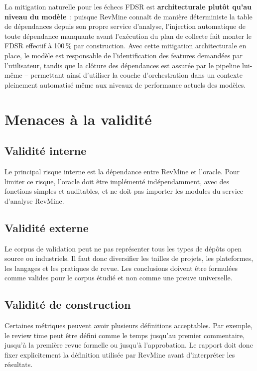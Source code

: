 La mitigation naturelle pour les échecs FDSR est \textbf{architecturale plutôt qu'au niveau du
modèle}~: puisque RevMine connaît de manière déterministe la table de dépendances depuis son
propre service d'analyse, l'injection automatique de toute dépendance manquante avant l'exécution
du plan de collecte fait monter le FDSR effectif à 100\,\% par construction. Avec cette
mitigation architecturale en place, le modèle est responsable de l'identification des features
demandées par l'utilisateur, tandis que la clôture des dépendances est assurée par le pipeline
lui-même -- permettant ainsi d'utiliser la couche d'orchestration dans un contexte pleinement
automatisé même aux niveaux de performance actuels des modèles.


\section{Menaces à la validité}
\label{sec:menaces-validite}

\subsection{Validité interne}

Le principal risque interne est la dépendance entre RevMine et l'oracle. Pour limiter ce risque, l'oracle doit être implémenté indépendamment, avec des fonctions simples et auditables, et ne doit pas importer les modules du service d'analyse RevMine.

\subsection{Validité externe}

Le corpus de validation peut ne pas représenter tous les types de dépôts open source ou industriels. Il faut donc diversifier les tailles de projets, les plateformes, les langages et les pratiques de revue. Les conclusions doivent être formulées comme valides pour le corpus étudié et non comme une preuve universelle.

\subsection{Validité de construction}

Certaines métriques peuvent avoir plusieurs définitions acceptables. Par exemple, le review time peut être défini comme le temps jusqu'au premier commentaire, jusqu'à la première revue formelle ou jusqu'à l'approbation. Le rapport doit donc fixer explicitement la définition utilisée par RevMine avant d'interpréter les résultats.

